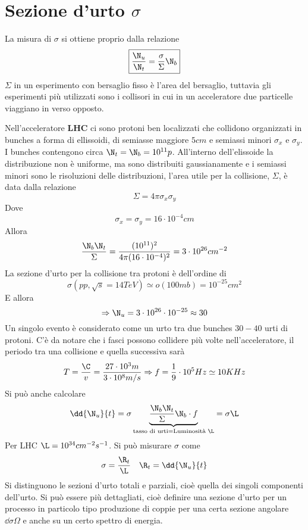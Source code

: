 \documentclass[12pt]{book}
\begin{document}
\section{Sezione d'urto $\sigma$}
 La misura di $\sigma$ si ottiene proprio dalla relazione 
\begin{equation}
	\boxed{\frac{\N_u}{\N_t}=\frac{\sigma}{\Sigma}\N_b}
\end{equation}
$\Sigma$ in un esperimento con bersaglio fisso è l'area del bersaglio, tuttavia gli esperimenti più utilizzati sono i collisori in cui in un acceleratore due particelle viaggiano in verso opposto. 

Nell'acceleratore \textbf{LHC} ci sono protoni ben localizzati che collidono organizzati in bunches a forma di ellissoidi, di semiasse maggiore $5cm$ e semiassi minori $\sigma_x$ e $\sigma_y$. I bunches contengono circa $\N_t=\N_b=10^{11} p$. All'interno dell'elissoide la distribuzione non è uniforme, ma sono distribuiti gaussianamente e i semiassi minori sono le risoluzioni delle distribuzioni, l'area utile per la collisione, $\Sigma$, è data dalla relazione
\begin{equation}
	\Sigma = 4 \pi \sigma_x \sigma_y
\end{equation}
Dove
\begin{equation}
	\sigma_x = \sigma_y = 16 \cdot 10^{-4} cm
\end{equation}
Allora
\begin{equation}
	\frac{\N_b \N_t}{\Sigma} = \frac{(10^{11})^2}{4 \pi (16 \cdot 10^{-4})^2} =  3 \cdot 10^{26} cm^{-2}
\end{equation}
La sezione d'urto per la collisione tra protoni è dell'ordine di
\begin{equation}
	\sigma (pp, \sqrt{s}=14 TeV) \simeq o(100mb) = 10^{-25}cm^2
\end{equation}
E allora
\begin{equation}
	\Rightarrow \N_u = 3 \cdot 10^{26} \cdot 10^{-25} \approx 30
\end{equation}
Un singolo evento è considerato come un urto tra due bunches $30-40$ urti di protoni. C'è da notare che i fasci possono collidere più volte nell'acceleratore, il periodo tra una collisione e quella successiva sarà
\begin{equation}
	T= \frac{\C}{v}=\frac{27 \cdot 10^3m}{3 \cdot 10^8 m/s} \Rightarrow f=\frac{1}{9} \cdot 10^5 Hz \simeq 10 KHz
\end{equation}
Si può anche calcolare
\begin{equation}
	\dd{\N_u}{t} = \sigma \underbrace{\frac{\N_b \N_t}{\Sigma} \N_b \cdot f}_{\text{tasso di urti} = \text{Luminosità } \L } = \sigma \L
\end{equation}
Per LHC $\L= 10^{34} cm^{-2} s^{-1}$. Si può misurare $\sigma$ come
\begin{equation}
	\sigma = \frac{\R_t}{\L} \ \ \ \R_t= \dd{\N_u}{t}
\end{equation}
Si distinguono le sezioni d'urto totali e parziali, cioè quella dei singoli componenti dell'urto. Si può essere più dettagliati, cioè definire una sezione d'urto per un processo in particolo tipo produzione di coppie per una certa sezione angolare $\dd{\sigma}{\Omega}$ e anche su un certo spettro di energia. 
\end{document}
